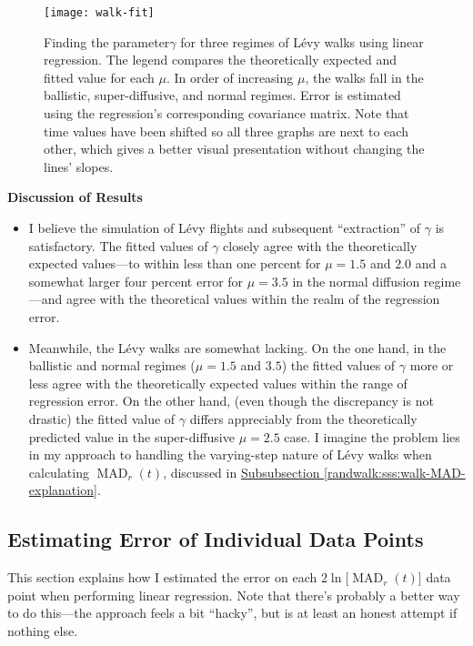 \documentclass[11pt, a4paper]{article}
\newcommand{\lev}{L\'evy\xspace}
\newcommand{\mad}{\operatorname{MAD}}
\begin{document}
\begin{figure}
	\centering
	\texttt{[image: walk-fit]}
	\caption{Finding the parameter$ \gamma $  for three regimes of \lev walks using linear regression. The legend compares the theoretically expected and fitted value for each $ \mu $. In order of increasing $ \mu $, the walks fall in the ballistic, super-diffusive, and normal regimes. Error is estimated using the regression's corresponding covariance matrix. Note that time values have been shifted so all three graphs are next to each other, which gives a better visual presentation without changing the lines' slopes.}
	\label{randwalk:fig:walk-fit}
\end{figure}

\vspace{2mm}
\textbf{Discussion of Results}
\begin{itemize}
	\item I believe the simulation of \lev flights and subsequent ``extraction'' of $ \gamma $ is satisfactory. The fitted values of $ \gamma $ closely agree with the theoretically expected values---to within less than one percent for $ \mu = 1.5 $ and $ 2.0 $ and a somewhat larger four percent error for $ \mu = 3.5 $ in the normal diffusion regime---and agree with the theoretical values within the realm of the regression error.
	
	\item Meanwhile, the \lev walks are somewhat lacking. On the one hand, in the ballistic and normal regimes ($\mu = 1.5$ and $ 3.5 $) the fitted values of $ \gamma $ more or less agree with the theoretically expected values within the range of regression error. On the other hand, (even though the discrepancy is not drastic) the fitted value of $ \gamma $ differs appreciably from the theoretically predicted value in the super-diffusive $ \mu = 2.5 $ case. I imagine the problem lies in my approach to handling the varying-step nature of \lev walks when calculating $ \mad_{r}(t) $, discussed in \hyperref[randwalk:sss:walk-MAD-explanation]{Subsubsection \ref{randwalk:sss:walk-MAD-explanation}}.
	
\end{itemize}


\subsection{Estimating Error of Individual Data Points} \label{randwalk:ss:error}
This section explains how I estimated the error on each $ 2 \ln\big[\mad_{r}(t)\big] $ data point when performing linear regression. Note that there's probably a better way to do this---the approach feels a bit ``hacky'', but is at least an honest attempt if nothing else.
\end{document}
